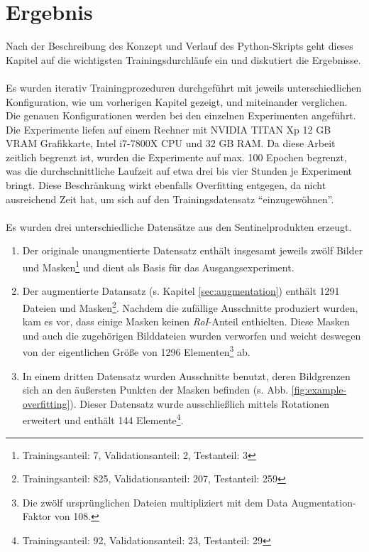 \chapter{Ergebnis}\label{chap:experiments}

Nach der Beschreibung des Konzept und Verlauf des Python-Skripts geht dieses Kapitel auf die wichtigsten Trainingsdurchläufe ein und diskutiert die Ergebnisse. 
\\\\
Es wurden iterativ Trainingprozeduren durchgeführt mit jeweils unterschiedlichen Konfiguration, wie um vorherigen Kapitel gezeigt, und miteinander verglichen. Die genauen Konfigurationen werden bei den einzelnen Experimenten angeführt. Die Experimente liefen auf einem Rechner mit NVIDIA TITAN Xp 12 GB VRAM Grafikkarte, Intel i7-7800X CPU und 32 GB RAM. Da diese Arbeit zeitlich begrenzt ist, wurden die Experimente auf max. 100 Epochen begrenzt, was die durchschnittliche Laufzeit auf etwa drei bis vier Stunden je Experiment bringt. Diese Beschränkung wirkt ebenfalls Overfitting entgegen, da nicht ausreichend Zeit hat, um sich auf den Trainingsdatensatz "`einzugewöhnen"'.
\\\\
Es wurden drei unterschiedliche Datensätze aus den Sentinelprodukten erzeugt. 
\begin{enumerate}
	\item Der originale unaugmentierte Datensatz enthält insgesamt jeweils zwölf Bilder und Masken\footnote{Trainingsanteil: 7, Validationsanteil: 2, Testanteil: 3} und dient als Basis für das Ausgangsexperiment. 
	\item Der augmentierte Datansatz (s. Kapitel \ref{sec:augmentation}) enthält 1291 Dateien und Masken\footnote{Trainingsanteil: 825, Validationsanteil: 207, Testanteil: 259}. Nachdem die zufällige Ausschnitte produziert wurden, kam es vor, dass einige Masken keinen \textit{RoI}-Anteil enthielten. Diese Masken und auch die zugehörigen Bilddateien wurden verworfen und weicht deswegen von der eigentlichen Größe von 1296 Elementen\footnote{Die zwölf ursprünglichen Dateien multipliziert mit dem Data Augmentation-Faktor von 108.} ab.
	\item In einem dritten Datensatz wurden Ausschnitte benutzt, deren Bildgrenzen sich an den äußersten Punkten der Masken befinden (s. Abb. \ref{fig:example-overfitting}). Dieser Datensatz wurde ausschließlich mittels Rotationen erweitert und enthält 144 Elemente\footnote{Trainingsanteil: 92, Validationsanteil: 23, Testanteil: 29}. 
\end{enumerate}
\noindent

